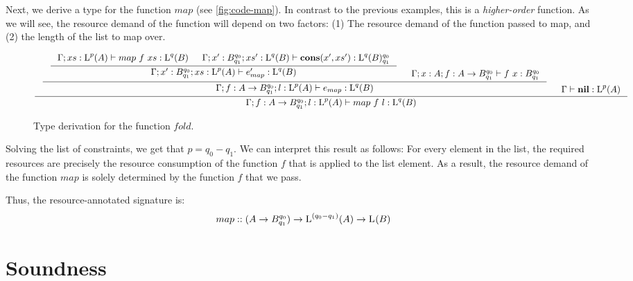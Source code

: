 \begin{example}
   Next, we derive a type for the function \(map\) (see \cref{fig:code-map}). In contrast to the previous examples, this is a \emph{higher-order} function. As we will see, the resource demand of the function will depend on two factors: (1) The resource demand of the function passed to map, and (2) the length of the list to map over.

   \begin{figure}[H]
      \[
         \inference
         {
            \inference
            {
               \inference
               {
                  \typing{\Gamma;xs:\ralist{p}{A}}{map~f~xs}{\ralist{q}{B}}
                  &
                  \typing{\Gamma;x':\ratype{B}{q_0}{q_1};xs':\ralist{q}{B}}{\cons{x'}{xs'}}{\ratype{\ralist{q}{B}}{q_0}{q_1}}
               }
               {
                  \typing{\Gamma;x':\ratype{B}{q_0}{q_1};xs:\ralist{p}{A}}{e_{map}'}{\ralist{q}{B}}
               }
               &
               \typing{\Gamma;x:A;f:\rafunc{A}{B}{q_0}{q_1}}{f~x}{\ratype{B}{q_0}{q_1}}
            }
            {
               \typing{\Gamma;f:\rafunc{A}{B}{q_0}{q_1};l:\ralist{p}{A}}{e_{map}}{\ralist{q}{B}}
            }
            &
            \typing{\Gamma}{\listnil}{\ralist{p}{A}}
         }
         {
            \typing{\Gamma;f:\rafunc{A}{B}{q_0}{q_1};l:\ralist{p}{A}}{map~f~l}{\ralist{q}{B}}
         }
      \]
   \caption{Type derivation for the function \(fold\).}
   \label{fig:derivation-fold}
   \end{figure}

Solving the list of constraints, we get that \(p = q_0 - q_1\). We can interpret this result as follows: For every element in the list, the required resources are precisely the resource consumption of the function \(f\) that is applied to the list element. As a result, the resource demand of the function \(map\) is solely determined by the function \(f\) that we pass.

Thus, the resource-annotated signature is:
\[
   map :: (A \to B ^{q_0}_{q_1}) \to \text{L}^{(q_0 - q_1)}(A) \to \text{L}^{}(B)
\]

\end{example}

\section{Soundness}\label{sec:soundness-6}

